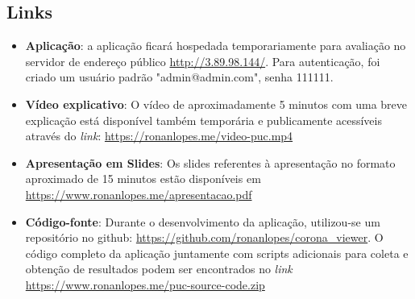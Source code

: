 \begin{apendicesenv}
	
	\partapendices
	
\chapter{Links} \label{links}

\begin{itemize}

	\item \textbf{Aplicação}: a aplicação ficará hospedada temporariamente para avaliação no servidor de endereço público \href{http://3.89.98.144/}{http://3.89.98.144/}. Para autenticação, foi criado um usuário padrão "admin@admin.com", senha 111111.
	\item \textbf{Vídeo explicativo}: O vídeo de aproximadamente 5 minutos com uma breve explicação está disponível também temporária e publicamente acessíveis através do \textit{link}: \href{https://ronanlopes.me/video-puc.mp4}{https://ronanlopes.me/video-puc.mp4}
	\item \textbf{Apresentação em Slides}: Os slides referentes à apresentação no formato aproximado de 15 minutos estão disponíveis em \href{https://www.ronanlopes.me/apresentacao.pdf}{https://www.ronanlopes.me/apresentacao.pdf}
	\item \textbf{Código-fonte}: Durante o desenvolvimento da aplicação, utilizou-se um repositório no github: \href{https://github.com/ronanlopes/corona\_viewer}{https://github.com/ronanlopes/corona\_viewer}. O código completo da aplicação juntamente com scripts adicionais para coleta e obtenção de resultados podem ser encontrados no \textit{link} \href{https://www.ronanlopes.me/puc-source-code.zip}{https://www.ronanlopes.me/puc-source-code.zip}


\end{itemize}



\end{apendicesenv}